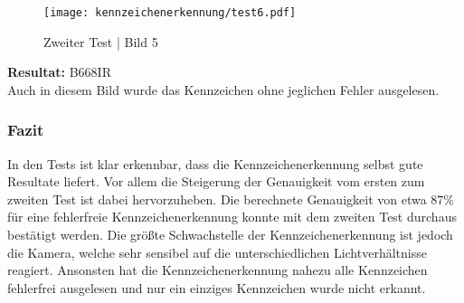 \begin{figure}[H]
    \centering
    \texttt{[image: kennzeichenerkennung/test6.pdf]}
    \caption{Zweiter Test | Bild 5}
\end{figure}

\textbf{Resultat:} B668IR\\

Auch in diesem Bild wurde das Kennzeichen ohne jeglichen Fehler ausgelesen.

\subsubsection{Fazit}
In den Tests ist klar erkennbar, dass die Kennzeichenerkennung selbst gute Resultate liefert. Vor allem die Steigerung der Genauigkeit vom ersten zum zweiten 
Test ist dabei hervorzuheben. Die berechnete Genauigkeit von etwa 87\% für eine fehlerfreie Kennzeichenerkennung konnte mit dem zweiten Test durchaus bestätigt werden. 
Die größte Schwachstelle der Kennzeichenerkennung ist jedoch die Kamera, welche sehr sensibel auf die unterschiedlichen Lichtverhältnisse reagiert. 
Ansonsten hat die Kennzeichenerkennung nahezu alle Kennzeichen fehlerfrei ausgelesen und nur ein einziges Kennzeichen wurde nicht erkannt. 